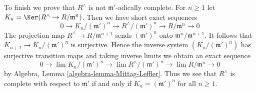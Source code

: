 \medskip\noindent
To finish we prove that $R^\wedge$ is not $\mathfrak m'$-adically complete.
For $n \geq 1$ let $K_n = \Ker(R^\wedge \to R/\mathfrak m^n)$. Then
we have short exact sequences
$$
0 \to K_n/(\mathfrak m')^n \to R^\wedge/(\mathfrak m')^n \to
R/\mathfrak m^n \to 0
$$
The projection map $R^\wedge \to R/\mathfrak m^{n + 1}$ sends
$(\mathfrak m')^n$ onto $\mathfrak m^n/\mathfrak m^{n + 1}$.
It follows that $K_{n + 1} \to K_n/(\mathfrak m')^n$ is surjective.
Hence the inverse system $\left(K_n/(\mathfrak m')^n\right)$
has surjective transition maps and
taking inverse limits we obtain an exact sequence
$$
0 \to \lim K_n/(\mathfrak m')^n \to
\lim R^\wedge/(\mathfrak m')^n \to
\lim R/\mathfrak m^n \to 0
$$
by Algebra, Lemma \ref{algebra-lemma-Mittag-Leffler}.
Thus we see that $R^\wedge$ is complete with respect to $\mathfrak m'$
if and only if $K_n = (\mathfrak m')^n$ for all $n \geq 1$.

